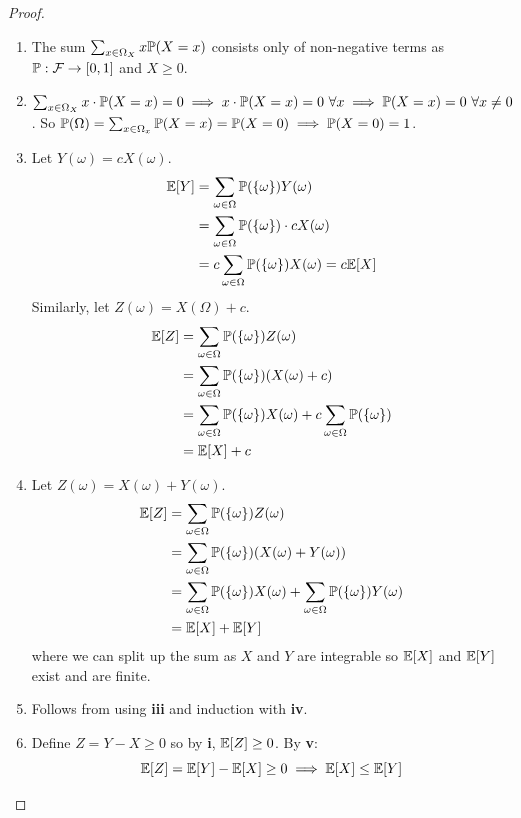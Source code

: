 \documentclass[../main.tex]{subfiles}
\begin{document}
\begin{proof}
  \begin{enumerate}
    \item The sum $\sum_{x \in \Omega_X} x\P(X = x)$ consists only of non-negative terms as $\P: \salg \to [0, 1]$ and $X \geq 0$.
    \item $\sum_{x \in \Omega_X} x \cdot \P(X = x) = 0 \implies x \cdot \P(X = x) = 0\ \forall x \implies \P(X = x) = 0\ \forall x \neq 0$.
      So $\P(\Omega) = \sum_{x \in \Omega_x} \P(X = x) = \P(X = 0) \implies \P(X = 0) = 1$.
    \item Let $Y(\omega) = cX(\omega)$.
      \begin{align*}
        \E[Y] &= \sum_{\omega \in \Omega} \P(\{\omega\})Y(\omega) \\
              &= \sum_{\omega \in \Omega} \P(\{\omega\}) \cdot cX(\omega) \\
              &= c \sum_{\omega \in \Omega} \P(\{\omega\}) X(\omega) = c\E[X]
      \end{align*}
      Similarly, let $Z(\omega) = X(\Omega) + c$.
      \begin{align*}
        \E[Z] &= \sum_{\omega \in \Omega} \P(\{\omega\})Z(\omega) \\
              &= \sum_{\omega \in \Omega} \P(\{\omega\})(X(\omega) + c) \\
              &= \sum_{\omega \in \Omega} \P(\{\omega\})X(\omega) + c \sum_{\omega \in \Omega} \P(\{\omega\}) \\
              &= \E[X] + c
      \end{align*}
    \item Let $Z(\omega) = X(\omega) + Y(\omega)$.
      \begin{align*}
        \E[Z] &= \sum_{\omega \in \Omega} \P(\{\omega\})Z(\omega) \\
              &= \sum_{\omega \in \Omega} \P(\{\omega\})(X(\omega) + Y(\omega)) \\
              &= \sum_{\omega \in \Omega} \P(\{\omega\})X(\omega) + \sum_{\omega \in \Omega} \P(\{\omega\})Y(\omega) \\
              &= \E[X] + \E[Y]
      \end{align*}
      where we can split up the sum as $X$ and $Y$ are integrable so $\E[X]$ and $\E[Y]$ exist and are finite.
    \item Follows from using \textbf{iii} and induction with \textbf{iv}.
    \item Define $Z = Y - X \geq 0$ so by \textbf{i}, $\E[Z] \geq 0$.
      By \textbf{v}:
      \[
        \E[Z] = \E[Y] - \E[X] \geq 0 \implies \E[X] \leq \E[Y]
      \]
  \end{enumerate}
\end{proof}
\end{document}
